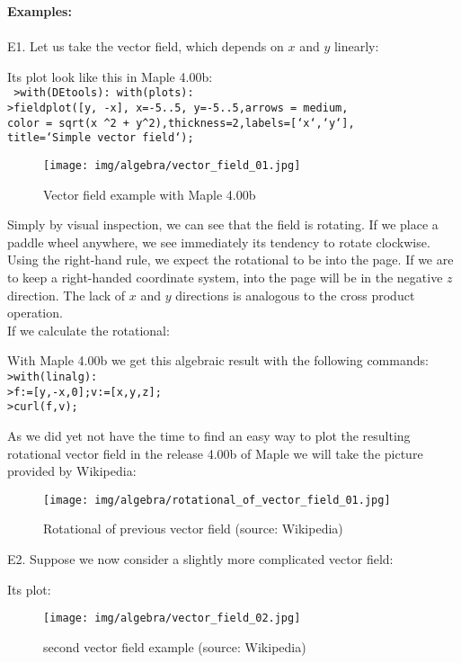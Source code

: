 	\begin{tcolorbox}[colframe=black,colback=white,sharp corners]
	\textbf{{\Large {}}Examples:}\\\\
	E1. Let us take the vector field, which depends on $x$ and $y$ linearly:
	
	Its plot look like this in Maple 4.00b:\\
	
	\texttt{
	>with(DEtools): with(plots):\\
	>fieldplot([y, -x], x=-5..5, y=-5..5,arrows = medium, \\
	color = sqrt(x \string^2 + y\string^2),thickness=2,labels=[`x`,`y`],\\
	title=`Simple vector field`);	
	}
	\begin{figure}[H]
		\centering
		\texttt{[image: img/algebra/vector\_field\_01.jpg]}
		\caption[]{Vector field example with Maple 4.00b}
	\end{figure}
	Simply by visual inspection, we can see that the field is rotating. If we place a paddle wheel anywhere, we see immediately its tendency to rotate clockwise. Using the right-hand rule, we expect the rotational to be into the page. If we are to keep a right-handed coordinate system, into the page will be in the negative $z$ direction. The lack of $x$ and $y$ directions is analogous to the cross product operation.\\

	If we calculate the rotational:
	
	\end{tcolorbox}
	
	\pagebreak
	\begin{tcolorbox}[colframe=black,colback=white,sharp corners]
	With Maple 4.00b we get this algebraic result with the following commands:\\
	
	\texttt{>with(linalg):\\
	>f:=[y,-x,0];v:=[x,y,z];\\
	>curl(f,v);\\
	}
	
	As we did yet not have the time to find an easy way to plot the resulting rotational vector field in the release 4.00b of Maple we will take the picture provided by Wikipedia:
	\begin{figure}[H]
		\centering
		\texttt{[image: img/algebra/rotational\_of\_vector\_field\_01.jpg]}
		\caption[]{Rotational of previous vector field (source: Wikipedia)}
	\end{figure}
		
	E2. Suppose we now consider a slightly more complicated vector field:
	
	Its plot:
	\begin{figure}[H]
		\centering
		\texttt{[image: img/algebra/vector\_field\_02.jpg]}
		\caption[]{second vector field example (source: Wikipedia)}
	\end{figure}
	\end{tcolorbox}
	
